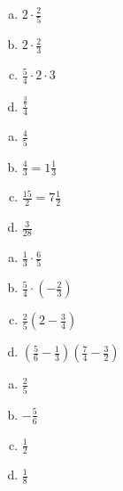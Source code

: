\begin{multicols}{2}
\begin{tehtava}
        \begin{enumerate}[a)]
        	\item $2 \cdot \frac{2}{5}$
        	\item $2 \cdot \frac{2}{3}$
        	\item $\frac{5}{4} \cdot 2 \cdot 3$
        	\item $\frac{\frac{3}{7}}{4}$ 
        \end{enumerate}
            \begin{vastaus}
        		\begin{enumerate}[a)]
        			\item $\frac{4}{5}$
        			\item $\frac{4}{3} = 1 \frac{1}{3}$
        			\item $\frac{15}{2} = 7 \frac{1}{2}$
        			\item $\frac{3}{28}$
        		\end{enumerate}
            \end{vastaus}
        \end{tehtava}
        
        \begin{tehtava}
        
        \begin{enumerate}[a)]
        	\item $\frac{1}{3} \cdot \frac{6}{5}$
        	\item $\frac{5}{4} \cdot (-\frac{2}{3})$ 
        	\item $\frac{2}{5} (2 - \frac{3}{4})$
        	\item $(\frac{5}{6} - \frac{1}{3})(\frac{7}{4} - \frac{3}{2})$
        \end{enumerate}
            \begin{vastaus}		
        		\begin{enumerate}[a)]
        			\item $\frac{2}{5}$
        			\item $-\frac{5}{6}$
        			\item $\frac{1}{2}$
        			\item $\frac{1}{8}$ 
        		\end{enumerate}
            \end{vastaus}
        \end{tehtava}
        
        \begin{tehtava}
        

\end{tehtava}
\end{multicols}

